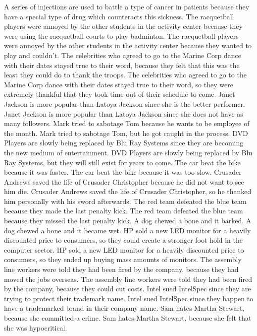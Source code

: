 \documentclass{article}
\begin{document}
\begin{enumerate}
	A series of injections are used to battle a type of cancer in patients because they have a special type of drug which counteracts this sickness.
	The racquetball players were annoyed by the other students in the activity center because they were using the racquetball courts to play badminton.
	The racquetball players were annoyed by the other students in the activity center because they wanted to play and couldn't.
	The celebrities who agreed to go to the Marine Corp dance with their dates stayed true to their word, because they felt that this was the least they could do to thank the troops.
	The celebrities who agreed to go to the Marine Corp dance with their dates stayed true to their word, so they were extremely thankful that they took time out of their schedule to come.
	Janet Jackson is more popular than Latoya Jackson since she is the better performer.
	Janet Jackson is more popular than Latoya Jackson since she does not have as many followers.
	Mark tried to sabotage Tom because he wants to be employee of the month.
	Mark tried to sabotage Tom, but he got caught in the process.
	DVD Players are slowly being replaced by Blu Ray Systems since they are becoming the new medium of entertainment.
	DVD Players are slowly being replaced by Blu Ray Systems, but they will still exist for years to come.
	The car beat the bike because it was faster.
	The car beat the bike because it was too slow.
	Crusader Andrews saved the life of Crusader Christopher because he did not want to see him die.
	Crusader Andrews saved the life of Crusader Christopher, so he thanked him personally with his sword afterwards.
	The red team defeated the blue team because they made the last penalty kick.
	The red team defeated the blue team because they missed the last penalty kick.
	A dog chewed a bone and it barked.
	A dog chewed a bone and it became wet.
	HP sold a new LED monitor for a heavily discounted price to consumers, so they could create a stronger foot hold in the computer sector.
	HP sold a new LED monitor for a heavily discounted price to consumers, so they ended up buying mass amounts of monitors.
	The assembly line workers were told they had been fired by the company, because they had moved the jobs overseas.
	The assembly line workers were told they had been fired by the company, because they could cut costs.
	Intel sued IntelSpec since they are trying to protect their trademark name.
	Intel sued IntelSpec since they happen to have a trademarked brand in their company name.
	Sam hates Martha Stewart, because she committed a crime.
	Sam hates Martha Stewart, because she felt that she was hypocritical.

\end{enumerate}
\end{document}
